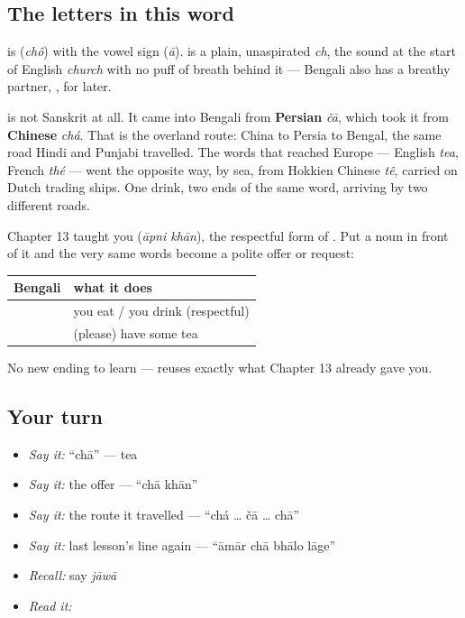\subsection*{The letters in this word}
\textbf{} is \textbf{} (\emph{chô}) with the vowel sign \textbf{} (\emph{ā}). \textbf{} is a plain, unaspirated \emph{ch}, the sound at the start of English \emph{church} with no puff of breath behind it — Bengali also has a breathy partner, \textbf{}, for later.

\begin{cousinweb}
\textbf{} is not Sanskrit at all. It came into Bengali from \textbf{Persian} \emph{čā}, which took it from \textbf{Chinese} \emph{chá}. That is the overland route: China to Persia to Bengal, the same road Hindi and Punjabi travelled. The words that reached Europe — English \emph{tea}, French \emph{thé} — went the opposite way, by sea, from Hokkien Chinese \emph{tê}, carried on Dutch trading ships. One drink, two ends of the same word, arriving by two different roads.
\end{cousinweb}

\begin{grammarlens}[title={Grammar Lens: an offer, built on a form you already have}]
Chapter 13 taught you \textbf{ } (\emph{āpni khān}), the respectful form of . Put a noun in front of it and the very same words become a polite offer or request:

\noindent
\begin{tabularx}{\linewidth}{@{}>{\raggedright\arraybackslash}X>{\raggedright\arraybackslash}X@{}}
\toprule
\textbf{Bengali} & \textbf{what it does} \\
\midrule
\bn{আপনি} \bn{খান} & you eat / you drink (respectful) \\
\textbf{\bn{চা} \bn{খান}} & (please) have some tea \\
\bottomrule
\end{tabularx}

No new ending to learn —   reuses exactly what Chapter 13 already gave you.
\end{grammarlens}

\subsection*{Your turn}
\begin{itemize}
\raggedright
  \item \emph{Say it:} \textquotedblleft{}chā\textquotedblright{} — tea
  \item \emph{Say it:} the offer — \textquotedblleft{}chā khān\textquotedblright{}
  \item \emph{Say it:} the route it travelled — \textquotedblleft{}chá … čā … chā\textquotedblright{}
  \item \emph{Say it:} last lesson's line again — \textquotedblleft{}āmār chā bhālo lāge\textquotedblright{}
  \item \emph{Recall:} say \emph{jāwā}
  \item \emph{Read it:} \textbf{}
\end{itemize}

